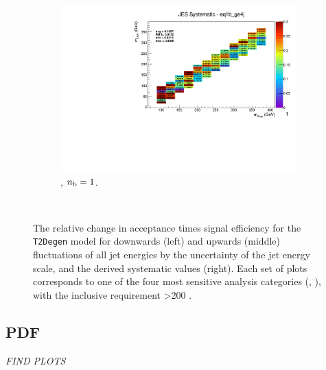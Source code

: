 \begin{figure}[ht!]
\begin{subfigure}[b]{0.32\textwidth}
    \includegraphics[width=\textwidth, page=1]{Figs/sms/t2degen/v19/systs/T2_4body_JES_eq1b_ge4j.pdf}
    \caption{\njhigh, $n_{\text{b}} = 1$.}
    \label{fig:sms-jes-tdegen-ge4j-1b}
  \end{subfigure}\\
  \caption{The relative change in acceptance times signal efficiency for the
  \texttt{T2Degen} model for downwards (left) and upwards (middle) fluctuations
  of all jet energies by the uncertainty of the jet energy scale, and the 
  derived systematic values (right). Each set of plots corresponds to one of
  the four most sensitive analysis categories (\nb, \nj), with the inclusive 
  requirement \HT>200 \gev.}
  \label{fig:sms-jes-t2degen}
\end{figure}


\newpage
\subsection*{PDF}
\label{sec:t2degen_pdf_plots}
\emph{FIND PLOTS}



